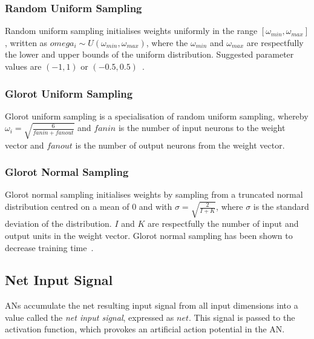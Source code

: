 \subsubsection{Random Uniform Sampling}\label{sec:anns:an:weights:random_uniform_sampling}

Random uniform sampling initialises weights uniformly in the range $[\omega_{min}, \omega_{max}]$, written as $omega_{i} \sim \textit{U} (\omega_{min}, \omega_{max})$, where the $\omega_{min}$ and $\omega_{max}$ are respectfully the lower and upper bounds of the uniform distribution. Suggested parameter values are $(-1, 1)$ or $(-0.5, 0.5)$~\cite{ref:nguyen:1990}.


\subsubsection{Glorot Uniform Sampling}\label{sec:anns:an:weights:glorot_uniform_sampling}

Glorot uniform sampling is a specialisation of random uniform sampling, whereby $\omega_{i} = \sqrt{\frac{6}{fanin + fanout}}$ and $fanin$ is the number of input neurons to the weight vector and $fanout$ is the number of output neurons from the weight vector.

\subsubsection{Glorot Normal Sampling}\label{sec:anns:an:weights:glorot_normal_sampling}

Glorot normal sampling initialises weights by sampling from a truncated normal distribution centred on a mean of $0$ and with $\sigma = \sqrt{\frac{2}{I + K}}$, where $\sigma$ is the standard deviation of the distribution. $I$ and $K$ are respectfully the number of input and output units in the weight vector. Glorot normal sampling has been shown to decrease training time~\cite{ref:glorot:2010}.


\subsection{Net Input Signal}\label{sec:anns:an:net_input}

\acp{AN} accumulate the net resulting input signal from all input dimensions into a value called the \textit{net input signal}, expressed as $net$. This signal is passed to the activation function, which provokes an artificial action potential in the \acs{AN}.

